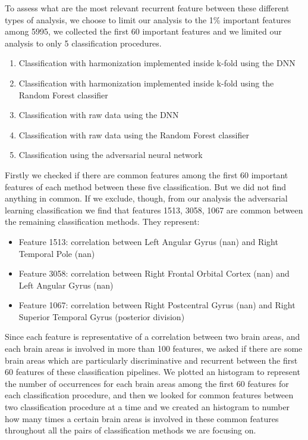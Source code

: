 \documentclass[11pt]{report}
\begin{document}
To assess what are the most relevant recurrent feature between these different types of analysis, we choose to limit our analysis to the 1\% important features among 5995, we collected the first 60 important features and we limited our analysis to only 5 classification procedures.


\begin{enumerate}
\item Classification with harmonization implemented inside k-fold using the DNN \label{proc:dnn_kfold}
\item Classification with harmonization implemented inside k-fold using the Random Forest classifier \label{proc:rf_kfold}
\item Classification with raw data using the DNN \label{proc:dnn_no}
\item Classification with raw data using the Random Forest classifier \label{proc:rf_no}
\item Classification using the adversarial neural network \label{proc:adv}
\end{enumerate}



Firstly we checked if there are common features among the first 60 important features of each method between these five classification.
But we did not find anything in common.
If we exclude, though, from our analysis the adversarial learning classification we find that features 1513, 3058, 1067 are common between the remaining classification methods.
They represent:
\begin{itemize}
\item Feature 1513: correlation between Left Angular Gyrus (nan) and Right Temporal Pole (nan)
\item Feature 3058: correlation between Right Frontal Orbital Cortex (nan) and Left Angular Gyrus (nan)
\item Feature 1067: correlation between Right Postcentral Gyrus (nan) and Right Superior Temporal Gyrus (posterior division)
\end{itemize}


Since each feature is representative of a correlation between two brain areas, and each brain areas is involved in more than 100 features, we asked if there are some brain areas which are particularly discriminative and recurrent between the first 60 features of these classification pipelines.
We plotted an histogram to represent the number of occurrences for each brain areas among the first 60 features for each classification procedure, and then we looked for common features between two classification procedure at a time and we created an histogram to number how many times a certain brain areas is involved in these common features throughout all the pairs of classification methods we are focusing on.
\end{document}
